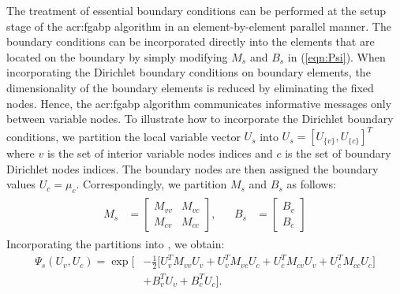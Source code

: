 The treatment of essential boundary conditions can be performed at the setup stage of the \gls{acr:fgabp} algorithm in an element-by-element parallel manner.
The boundary conditions can be incorporated directly into the elements that are located on the boundary by simply modifying $M_s$ and $B_s$ in (\ref{eqn:Psi}).
When incorporating the Dirichlet boundary conditions on boundary elements, the dimensionality of the boundary elements is reduced by eliminating the fixed nodes.
Hence, the \gls{acr:fgabp} algorithm communicates informative messages only between variable nodes.
To illustrate how to incorporate the Dirichlet boundary conditions, we partition the local variable vector $U_s$ into $U_s=\left[ U_{\{v\}}, U_{\{c\}}  \right]^T$ where $v$ is the set of interior variable nodes indices and $c$ is the set of boundary Dirichlet nodes indices.
The boundary nodes are then assigned the boundary values $U_c=\mu_c$.
Correspondingly, we partition $M_s$ and $B_s$ as follows:
\begin{equation}
	\begin{array}{cc}
		\begin{aligned}M_s & =\left[\begin{array}{cc}
				M_{vv} & M_{vc}\\
				M_{cv} & M_{cc}
			\end{array}\right],\end{aligned}
		& \begin{aligned}B_s & =\left[\begin{array}{c}
				B_v\\
				B_c
			\end{array}\right]\end{aligned}
	\end{array}
\end{equation}
Incorporating the partitions into , we obtain:
\begin{equation}
	\begin{split}
		\Psi_s(U_v, U_c) =  \exp\biggl[ & -\frac{1}{2} \bigl[ U^T_v M_{vv} U_v + U^T_v M_{vc} U_c + U^T_c M_{cv} U_v + U^T_c M_{cc} U_c \bigr]\\
		& + B_v^T U_v + B_c^T U_c \biggr]. \label{eqn:splitBndPsi}
	\end{split}
\end{equation}

